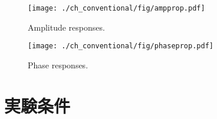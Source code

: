 \begin{figure}[!t]
\centering
\texttt{[image: ./ch\_conventional/fig/ampprop.pdf]}
\caption{Amplitude responses.}
\label{fig:ampres}
\end{figure}

\begin{figure}[!t]
\centering
\texttt{[image: ./ch\_conventional/fig/phaseprop.pdf]}
\caption{Phase responses.}
\label{fig:phaseres}
\end{figure}

\section{実験条件}
\label{sec:conv:expcond5}

